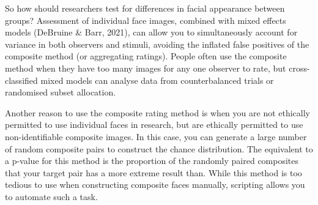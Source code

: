 \documentclass[
  doc,floatsintext]{apa6}
\begin{document}
So how should researchers test for differences in facial appearance between groups? Assessment of individual face images, combined with mixed effects models (DeBruine \& Barr, 2021), can allow you to simultaneously account for variance in both observers and stimuli, avoiding the inflated false positives of the composite method (or aggregating ratings). People often use the composite method when they have too many images for any one observer to rate, but cross-classified mixed models can analyse data from counterbalanced trials or randomised subset allocation.

Another reason to use the composite rating method is when you are not ethically permitted to use individual faces in research, but are ethically permitted to use non-identifiable composite images. In this case, you can generate a large number of random composite pairs to construct the chance distribution. The equivalent to a p-value for this method is the proportion of the randomly paired composites that your target pair has a more extreme result than. While this method is too tedious to use when constructing composite faces manually, scripting allows you to automate such a task.
\end{document}

